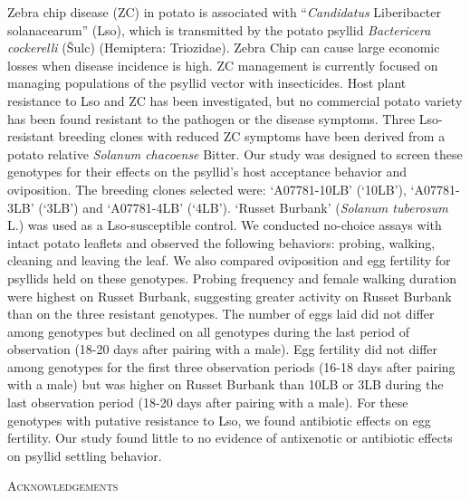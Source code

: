 \documentclass{UIdahoMastersThesis}
\begin{document}
\raggedright
\setlength\parindent{2em}
Zebra chip disease (ZC) in potato is associated with “\textit{Candidatus} Liberibacter solanacearum” (Lso), which is transmitted by the potato psyllid \textit{Bactericera cockerelli} (Šulc) (Hemiptera: Triozidae). Zebra Chip can cause large economic losses when disease incidence is high. ZC management is currently focused on managing populations of the psyllid vector with insecticides. Host plant resistance to Lso and ZC has been investigated, but no commercial potato variety has been found resistant to the pathogen or the disease symptoms. Three Lso-resistant breeding clones with reduced ZC symptoms have been derived from a potato relative \textit{Solanum chacoense} Bitter. Our study was designed to screen these genotypes for their effects on the psyllid’s host acceptance behavior and oviposition.  The breeding clones selected were: ‘A07781-10LB’ (‘10LB’), ‘A07781-3LB’ (‘3LB’) and ‘A07781-4LB’ (‘4LB’). ‘Russet Burbank’ (\textit{Solanum tuberosum}  L.) was used as a Lso-susceptible control. We conducted no-choice assays with intact potato leaflets and observed the following behaviors: probing, walking, cleaning and leaving the leaf. We also compared oviposition and egg fertility for psyllids held on these genotypes. Probing frequency and female walking duration were highest on Russet Burbank, suggesting greater activity on Russet Burbank than on the three resistant genotypes. The number of eggs laid did not differ among genotypes but declined on all genotypes during the last period of observation (18-20 days after pairing with a male). Egg fertility did not differ among genotypes for the first three observation periods (16-18 days after pairing with a male) but was higher on Russet Burbank than 10LB or 3LB during the last observation period (18-20 days after pairing with a male). For these genotypes with putative resistance to Lso, we found antibiotic effects on egg fertility. Our study found little to no evidence of antixenotic or antibiotic effects on psyllid settling behavior.
\newpage


 \begin{center}
 	{\LARGE\textsc{Acknowledgements}}
 \end{center}
\end{document}
